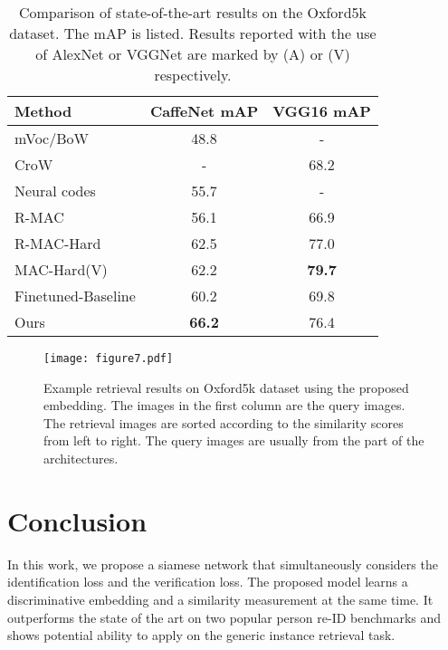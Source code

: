 \documentclass[journal]{IEEEtran}
\begin{document}
\begin{table}
\begin{center}
\begin{tabular}{l|c|c}
\hline
Method & CaffeNet mAP & VGG16 mAP\\
\hline
mVoc/BoW \cite{radenovic2015multiple} & 48.8 & -\\
CroW \cite{kalantidis2016cross} & - & 68.2\\
Neural codes \cite{babenko2014neural} & 55.7 & -\\
R-MAC \cite{tolias2015particular} & 56.1 & 66.9\\
R-MAC-Hard \cite{radenovic2016cnn} & 62.5 & 77.0\\
MAC-Hard(V) \cite{radenovic2016cnn} & 62.2 &\textbf{79.7} \\
\hline\hline
Finetuned-Baseline & 60.2 & 69.8\\
Ours & \textbf{66.2} & 76.4\\
\hline
\end{tabular}
\end{center}
\caption{Comparison of state-of-the-art results on the Oxford5k dataset. The mAP is listed. Results reported with the use of AlexNet\cite{krizhevsky2012imagenet} or VGGNet\cite{simonyan2014very} are marked by (A) or (V) respectively.}
\label{table:oxford5k}
\end{table}

\begin{figure}[t]
\begin{center}
\texttt{[image: figure7.pdf]}
\end{center}
   \caption{Example retrieval results on Oxford5k dataset \cite{philbin2007object} using the proposed embedding. The images in the first column are the query images. The retrieval images are sorted according to the similarity scores from left to right. The query images are usually from the part of the architectures.}
\label{fig:oxford5k}
\end{figure}

\section{Conclusion}\label{sec:conclusion}
In this work, we propose a siamese network that simultaneously considers the identification loss and the verification loss. The proposed model learns a discriminative embedding and a similarity measurement at the same time. It outperforms the state of the art on two popular person re-ID benchmarks and shows potential ability to apply on the generic instance retrieval task. 
\end{document}
